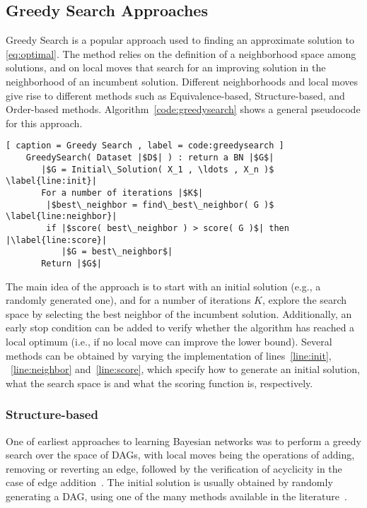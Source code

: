 \subsection{Greedy Search Approaches}
\label{subsec:greedysearch}

Greedy Search is a popular approach used to finding an approximate solution to \eqref{eq:optimal}. The method relies on the definition of a neighborhood space among solutions, and on local moves that search for an improving solution in the neighborhood of an incumbent solution. Different neighborhoods and local moves give rise to different methods such as Equivalence-based, Structure-based,  and Order-based methods. Algorithm~\ref{code:greedysearch} shows a general pseudocode for this approach.

\begin{lstlisting}[ caption = Greedy Search , label = code:greedysearch ]
	GreedySearch( Dataset |$D$| ) : return a BN |$G$|
	   |$G = Initial\_Solution( X_1 , \ldots , X_n )$ \label{line:init}|
	   For a number of iterations |$K$|
		|$best\_neighbor = find\_best\_neighbor( G )$ \label{line:neighbor}|
		if |$score( best\_neighbor ) > score( G )$| then |\label{line:score}|
		   |$G = best\_neighbor$|
	   Return |$G$|
\end{lstlisting}
The main idea of the approach is to start with an initial solution (e.g., a randomly generated one), and for a number of iterations $K$, explore the search space by selecting the best neighbor of the incumbent solution. Additionally, an early stop condition can be added to verify whether the algorithm has reached a local optimum (i.e., if no local move can improve the lower bound).
Several methods can be obtained by varying the implementation of lines~\ref{line:init}, ~\ref{line:neighbor} and~\ref{line:score}, which specify how to generate an initial solution, what the search space is and what the scoring function is, respectively.

\subsubsection{Structure-based}
\label{subsub:structurebased}
One of earliest approaches to learning Bayesian networks was to perform a greedy search over the space of DAGs, with local moves being the operations of adding, removing or reverting an edge, followed by the verification of acyclicity in the case of edge addition~\cite{Cooper92,GH08}. The initial solution is usually obtained by randomly generating a DAG, using one of the many methods available in the literature~\cite{Cozman02,Melancon04}.

